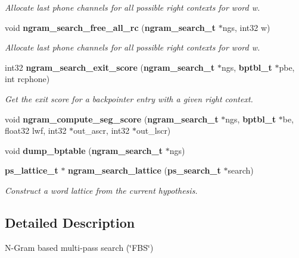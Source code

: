 \begin{DoxyCompactItemize}
\begin{DoxyCompactList}\small\item\em Allocate last phone channels for all possible right contexts for word w. \end{DoxyCompactList}\item 
void {\bf ngram\-\_\-search\-\_\-free\-\_\-all\-\_\-rc} ({\bf ngram\-\_\-search\-\_\-t} $\ast$ngs, int32 w)\label{ngram__search_8c_a15477192481dffcb29e9c4167eff6c3c}

\begin{DoxyCompactList}\small\item\em Allocate last phone channels for all possible right contexts for word w. \end{DoxyCompactList}\item 
int32 {\bf ngram\-\_\-search\-\_\-exit\-\_\-score} ({\bf ngram\-\_\-search\-\_\-t} $\ast$ngs, {\bf bptbl\-\_\-t} $\ast$pbe, int rcphone)\label{ngram__search_8c_a25a80e488425b2bd4e24eb753c9295a5}

\begin{DoxyCompactList}\small\item\em Get the exit score for a backpointer entry with a given right context. \end{DoxyCompactList}\item 
void {\bfseries ngram\-\_\-compute\-\_\-seg\-\_\-score} ({\bf ngram\-\_\-search\-\_\-t} $\ast$ngs, {\bf bptbl\-\_\-t} $\ast$be, float32 lwf, int32 $\ast$out\-\_\-ascr, int32 $\ast$out\-\_\-lscr)\label{ngram__search_8c_a7526cf720a80052770c5b6f82c93749d}

\item 
void {\bfseries dump\-\_\-bptable} ({\bf ngram\-\_\-search\-\_\-t} $\ast$ngs)\label{ngram__search_8c_ac10e5308e0a48948b3c21bb4c2d80c1b}

\item 
{\bf ps\-\_\-lattice\-\_\-t} $\ast$ {\bf ngram\-\_\-search\-\_\-lattice} ({\bf ps\-\_\-search\-\_\-t} $\ast$search)\label{ngram__search_8c_ac30e7dec4bbfeee9f5163abf4bbd1014}

\begin{DoxyCompactList}\small\item\em Construct a word lattice from the current hypothesis. \end{DoxyCompactList}\end{DoxyCompactItemize}


\subsection{Detailed Description}
N-\/\-Gram based multi-\/pass search (\char`\"{}\-F\-B\-S\char`\"{}) 

